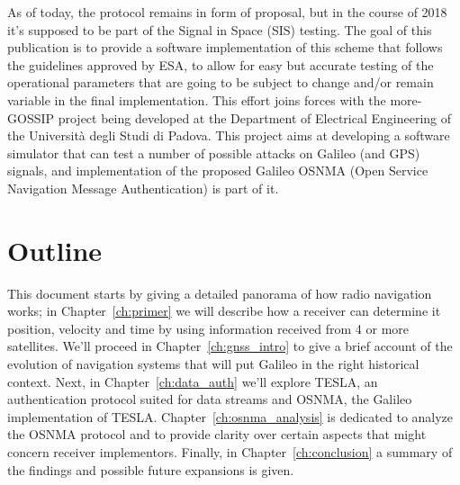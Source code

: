 \vspace{\baselineskip}

As of today, the protocol remains in form of proposal, but in the course of 2018
it's supposed to be part of the Signal in Space (SIS) testing. The goal of this
publication is to provide a software implementation of this scheme that follows
the guidelines approved by ESA, to allow for easy but accurate testing of the
operational parameters that are going to be subject to change and/or remain
variable in the final implementation. This effort joins forces with the
more-GOSSIP project being developed at the Department of Electrical Engineering
of the Università degli Studi di Padova. This project aims at developing a
software simulator that can test a number of possible attacks on Galileo (and
GPS) signals, and implementation of the proposed Galileo OSNMA (Open Service
Navigation Message Authentication) is part of it.

\section{Outline}

This document starts by giving a detailed panorama of how radio navigation
works; in Chapter~\ref{ch:primer} we will describe how a receiver can determine
it position, velocity and time by using information received from 4 or more
satellites. We'll proceed in Chapter~\ref{ch:gnss_intro} to give a brief account
of the evolution of navigation systems that will put Galileo in the right
historical context. Next, in Chapter~\ref{ch:data_auth} we'll explore TESLA, an
authentication protocol suited for data streams and OSNMA, the Galileo
implementation of TESLA. Chapter~\ref{ch:osnma_analysis} is dedicated to analyze
the OSNMA protocol and to provide clarity over certain aspects that might
concern receiver implementors. Finally, in Chapter~\ref{ch:conclusion} a summary
of the findings and possible future expansions is given.
